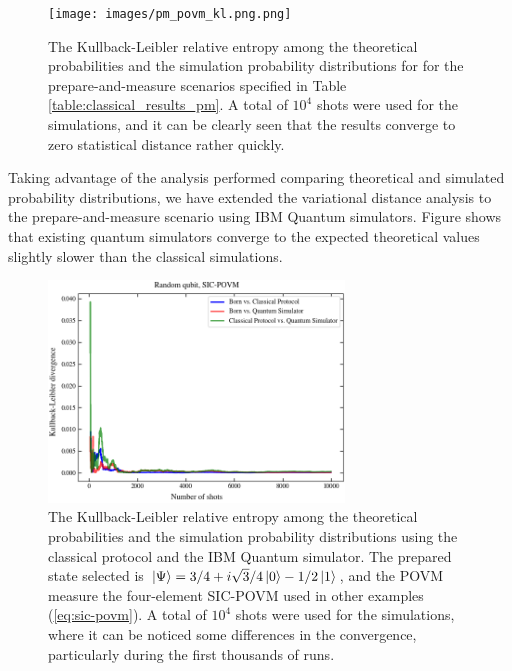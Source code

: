 \begin{figure}[h!]
\centering
\texttt{[image: images/pm\_povm\_kl.png.png]}
\caption{The Kullback-Leibler relative entropy among the theoretical probabilities and the simulation probability distributions for for the prepare-and-measure scenarios specified in Table \ref{table:classical_results_pm}. A total of $10^4$ shots were used for the simulations, and it can be clearly seen that the results converge to zero statistical distance rather quickly.}
\label{fig:classical_results_kl}
\end{figure}

Taking advantage of the analysis performed comparing theoretical and simulated probability distributions, we have extended the variational distance analysis to the prepare-and-measure scenario using IBM Quantum simulators. Figure shows that existing quantum simulators converge to the expected theoretical values slightly slower than the classical simulations. 

\begin{figure}[h!]
\centering
\includegraphics[width=0.7\textwidth]{images/pm_povm_kl_bcq.png}
\caption{The Kullback-Leibler relative entropy among the theoretical probabilities and the simulation probability distributions using the classical protocol and the IBM Quantum simulator. The prepared state selected is $\ket{\Psi}=3/4 + i \sqrt{3}/4 \ket{0} - 1/2 \ket{1}$, and the POVM measure the four-element SIC-POVM used in other examples (\ref{eq:sic-povm}). A total of $10^4$ shots were used for the simulations, where it can be noticed some differences in the convergence, particularly during the first thousands of runs.}
\label{fig:classical_results_kl}
\end{figure}